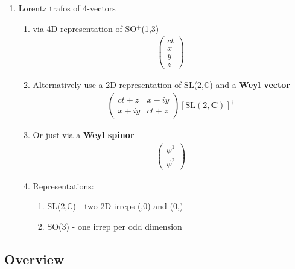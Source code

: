 \documentclass[../main.tex]{subfiles}
\begin{document}
\begin{itemize}
\begin{enumerate}
\begin{enumerate}
\begin{enumerate}
\end{enumerate}
\end{enumerate}
\item Lorentz trafos of 4-vectors
\begin{enumerate}
\item via 4D representation of SO$^+$(1,3)
\begin{align}
[\text{SO}^+(1,3)]
\left(\begin{matrix}
ct\\x\\y\\z
\end{matrix}\right)
\end{align}
\item Alternatively use a 2D representation of SL(2,$\mathbb{C}$) and a {\bf Weyl vector}
\begin{align}
[\text{SL}(2,\mathbf{C})]
\left(\begin{matrix}
ct+z & x-iy \\
x+iy & ct+z
\end{matrix}\right)
[\text{SL}(2,\mathbf{C})]^\dagger
\end{align}
\item Or just via a {\bf Weyl spinor}
\begin{align}
[\text{SL}(2,\mathbb{C})]
\left(\begin{matrix}
\psi^1 \\
\psi^2
\end{matrix}\right)
\end{align}

\item Representations:
\begin{enumerate}
\item SL(2,$\mathbb{C}$) - two 2D irreps (,0) and (0,)
\item SO(3) - one irrep per odd dimension

\end{enumerate}

\end{enumerate}
\end{enumerate}

\subsection{Overview}



\end{itemize}
\end{document}
